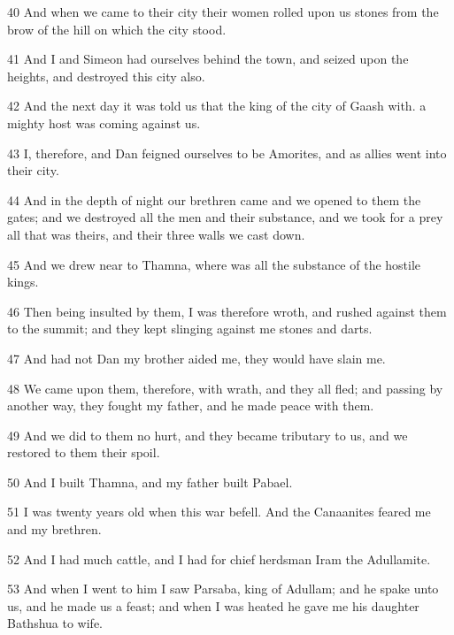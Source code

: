 \par 40 And when we came to their city their women rolled upon us stones from the brow of the hill on which the city stood.

\par 41 And I and Simeon had ourselves behind the town, and seized upon the heights, and destroyed this city also.

\par 42 And the next day it was told us that the king of the city of Gaash with. a mighty host was coming against us.

\par 43 I, therefore, and Dan feigned ourselves to be Amorites, and as allies went into their city.

\par 44 And in the depth of night our brethren came and we opened to them the gates; and we destroyed all the men and their substance, and we took for a prey all that was theirs, and their three walls we cast down.

\par 45 And we drew near to Thamna, where was all the substance of the hostile kings.

\par 46 Then being insulted by them, I was therefore wroth, and rushed against them to the summit; and they kept slinging against me stones and darts.

\par 47 And had not Dan my brother aided me, they would have slain me.

\par 48 We came upon them, therefore, with wrath, and they all fled; and passing by another way, they fought my father, and he made peace with them.

\par 49 And we did to them no hurt, and they became tributary to us, and we restored to them their spoil.

\par 50 And I built Thamna, and my father built Pabael.

\par 51 I was twenty years old when this war befell. And the Canaanites feared me and my brethren.

\par 52 And I had much cattle, and I had for chief herdsman Iram the Adullamite.

\par 53 And when I went to him I saw Parsaba, king of Adullam; and he spake unto us, and he made us a feast; and when I was heated he gave me his daughter Bathshua to wife.

